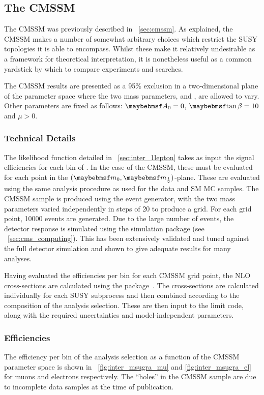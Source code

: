 \subsection{The \acs{CMSSM}}
The \ac{CMSSM} was previously described in \sec~\ref{sec:cmssm}. As explained,
the \ac{CMSSM} makes a number of somewhat arbitrary choices which restrict the
\ac{SUSY} topologies it is able to encompass. Whilst these make it relatively
undesirable as a framework for theoretical interpretation, it is nonetheless
useful as a common yardstick by which to compare experiments and searches.

The \ac{CMSSM} results are presented as a 95\% exclusion in a two-dimensional
plane of the parameter space where the two mass parameters, \Mzero and \Mhalf,
are allowed to vary. Other parameters are fixed as follows: $\Azero = 0$,
$\tanbeta = 10$ and $\mu > 0$.

\subsubsection{Technical Details}
The likelihood function detailed in \sec~\ref{sec:inter_1lepton} takes as input
the signal efficiencies for each bin of \STlep. In the case of the \ac{CMSSM},
these must be evaluated for each point in the $(\Mzero, \Mhalf)$-plane. These
are evaluated using the same analysis procedure as used for the data and \ac{SM}
\ac{MC} samples. The \ac{CMSSM} sample is produced using the \pythia event
generator, with the two mass parameters varied independently in steps of
\unit{20}{\GeV} to produce a grid. For each grid point, 10000 events are
generated. Due to the large number of events, the detector response is simulated
using the \fastsim simulation package (see \sec~\ref{sec:cms_computing}). This
has been extensively validated and tuned against the full detector simulation
and shown to give adequate results for many analyses.

Having evaluated the efficiencies per \STlep bin for each \ac{CMSSM} grid point,
the \ac{NLO} cross-sections are calculated using the \prospino
package~\cite{prospino}. The cross-sections are calculated individually for each
\ac{SUSY} subprocess and then combined according to the composition of the
analysis selection. These are then input to the limit code, along with the
required uncertainties and model-independent parameters.

\subsubsection{Efficiencies}
The efficiency per \STlep bin of the analysis selection as a function of the
\ac{CMSSM} parameter space is shown in \figs~\ref{fig:inter_msugra_mu} and
\ref{fig:inter_msugra_el} for muons and electrons respectively. The ``holes'' in
the \ac{CMSSM} sample are due to incomplete data samples at the time of
publication.

